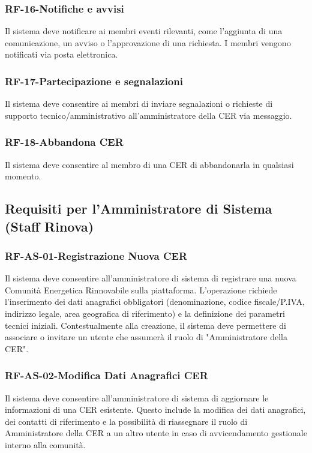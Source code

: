 \subsubsection*{RF-16-Notifiche e avvisi}
Il sistema deve notificare ai membri eventi rilevanti, come l’aggiunta di una comunicazione, un avviso o l’approvazione di una richiesta. I membri vengono notificati via posta elettronica.

\subsubsection*{RF-17-Partecipazione e segnalazioni}
Il sistema deve consentire ai membri di inviare segnalazioni o richieste di supporto tecnico/amministrativo all’amministratore della CER via messaggio.

\subsubsection*{RF-18-Abbandona CER}
Il sistema deve consentire al membro di una CER di abbandonarla in qualsiasi momento. 

\subsection{Requisiti per l'Amministratore di Sistema (Staff Rinova)}

\subsubsection*{RF-AS-01-Registrazione Nuova CER}
Il sistema deve consentire all'amministratore di sistema di registrare una nuova Comunità Energetica Rinnovabile sulla piattaforma. L'operazione richiede l'inserimento dei dati anagrafici obbligatori (denominazione, codice fiscale/P.IVA, indirizzo legale, area geografica di riferimento) e la definizione dei parametri tecnici iniziali. Contestualmente alla creazione, il sistema deve permettere di associare o invitare un utente che assumerà il ruolo di "Amministratore della CER".

\subsubsection*{RF-AS-02-Modifica Dati Anagrafici CER}
Il sistema deve consentire all'amministratore di sistema di aggiornare le informazioni di una CER esistente. Questo include la modifica dei dati anagrafici, dei contatti di riferimento e la possibilità di riassegnare il ruolo di Amministratore della CER a un altro utente in caso di avvicendamento gestionale interno alla comunità.

